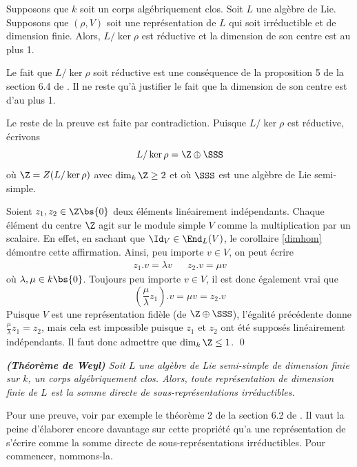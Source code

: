 \begin{Prop} \label{quotientreductif} Supposons que $k$ soit un corps algébriquement clos. Soit $L$ une algèbre de Lie. Supposons que $(\rho,V)$ soit une représentation de $L$ qui soit irréductible et de dimension finie. Alors, $L / \ker \rho$ est réductive et la dimension de son centre est au plus 1.
\begin{pre} Le fait que $L / \ker \rho$ soit réductive est une conséquence de la proposition 5 de la section 6.4 de \cite{Bourbakichap1}. Il ne reste qu'à justifier le fait que la dimension de son centre est d'au plus 1.  

Le reste de la preuve est faite par contradiction. Puisque $L/\ker \rho$ est réductive, écrivons
$$ L / \ker \rho = \Z \oplus \SSS $$ 
où $\Z = Z(L / \ker \rho)$ avec $\dim_k \Z \geq 2$ et où $\SSS$ est une algèbre de Lie semi-simple. 

Soient $z_1,z_2 \in \Z \bs \{0\}$ deux éléments linéairement indépendants. Chaque élément du centre $\Z$ agit sur le module simple $V$ comme la multiplication par un scalaire. En effet, en sachant que $\Id_V \in \End_L(V)$, le corollaire \ref{dimhom} démontre cette affirmation. Ainsi, peu importe $v \in V$, on peut écrire
\begin{align*}
z_1.v = \lambda v && z_2.v = \mu v
\end{align*}
où $\lambda, \mu \in k \bs \{0\}$.
Toujours peu importe $v \in V$, il est donc également vrai que
$$ \left(\frac{\mu}{\lambda}z_1\right).v = \mu v = z_2.v $$
Puisque $V$ est une représentation fidèle (de $\Z \oplus \SSS$), l'égalité précédente donne $\frac{\mu}{\lambda}z_1 = z_2$, mais cela est impossible puisque $z_1$ et $z_2$ ont été supposés linéairement indépendants. Il faut donc admettre que $\dim_k \Z \leq 1$. \qed
\end{pre}
\end{Prop}

\begin{Thm} \em \textbf{(Théorème de Weyl)} \label{weyl} \em Soit $L$ une algèbre de Lie semi-simple de dimension finie sur $k$, un corps algébriquement clos. Alors, toute représentation de dimension finie de $L$ est la somme directe de sous-représentations irréductibles.
\end{Thm}

Pour une preuve, voir par exemple le théorème 2 de la section 6.2 de \cite{Bourbakichap1}. Il vaut la peine d'élaborer encore davantage sur cette propriété qu'a une représentation de s'écrire comme la somme directe de sous-représentations irréductibles. Pour commencer, nommons-la.

